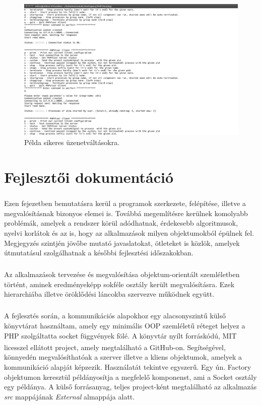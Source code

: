 \documentclass[12pt]{report}
\begin{document}
     \begin{figure}[ht]
  \centering
    \includegraphics[width=15cm]{pics/succ.png}
	  \caption{Példa sikeres üzenetváltásokra.}
      \label{fig:succ}
  \end{figure}
  \pagebreak
\chapter{Fejlesztői dokumentáció}
\paragraph{}
Ezen fejezetben bemutatásra kerül a programok szerkezete, felépítése, illetve a megvalósításnak bizonyos elemei is. Továbbá megemlítésre kerülnek komolyabb problémák, amelyek a rendszer körül adódhatnak, érdekesebb algoritmusok, nyelvi korlátok és az is, hogy az alkalmazások milyen objektumokból épülnek fel. Megjegyzés szintjén jövőbe mutató javaslatokat, ötleteket is közlök, amelyek útmutatásul szolgálhatnak a későbbi fejlesztési időszakokban.
\paragraph{}
Az alkalmazások tervezése és megvalósítása objektum-orientált szemléletben történt, aminek eredményeképp sokféle osztály került megvalósításra. Ezek hierarchiába illetve öröklődési láncokba szervezve működnek együtt.
\paragraph{}
A fejlesztés során, a kommunikációs alapokhoz egy alacsonyszintű külső könyvtárat használtam, amely egy minimális OOP szemléletű réteget helyez a PHP szolgáltatta socket függvények fölé. A könyvtár nyílt forráskódú, MIT licesszel ellátott project, amely megtalálható a GitHub-on.\textsuperscript{\cite{cluesocket}} Segítségével, könnyedén megvalósíthatóak a szerver illetve a kliens objektumok, amelyek a kommunikáció alapját képzezik. Használatát tekintve egyszerű. Egy ún. Factory objektumon keresztül példányosítja a megfelelő komponenst, ami a Socket osztály egy példánya.
A külső forrásanyag, teljes project-ként megtalálható az alkalmazás \textit{src} mappájának \textit{External} almappája alatt.
\pagebreak
\end{document}
